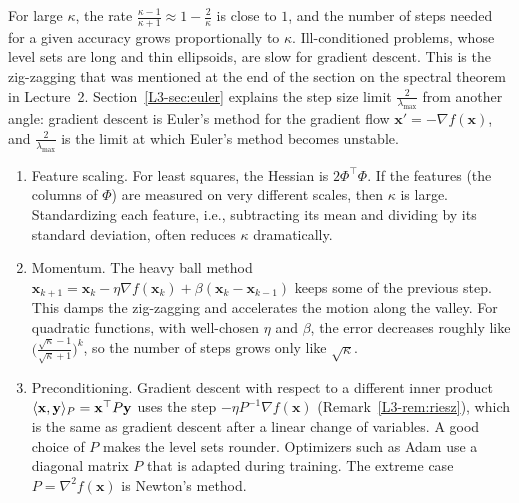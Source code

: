 For large $\kappa$, the rate $\frac{\kappa - 1}{\kappa + 1} \approx 1 - \frac{2}{\kappa}$ is close to $1$, and the number of steps needed for a given accuracy grows proportionally to $\kappa$. Ill-conditioned problems, whose level sets are long and thin ellipsoids, are slow for gradient descent. This is the zig-zagging that was mentioned at the end of the section on the spectral theorem in Lecture~2. Section~\ref{L3-sec:euler} explains the step size limit $\frac{2}{\lambda_{\max}}$ from another angle: gradient descent is Euler's method for the gradient flow $\mathbf{x}' = -\nabla f(\mathbf{x})$, and $\frac{2}{\lambda_{\max}}$ is the limit at which Euler's method becomes unstable.

\begin{remark}
    \begin{enumerate}
        \item Feature scaling. For least squares, the Hessian is $2\Phi^\top\Phi$. If the features (the columns of $\Phi$) are measured on very different scales, then $\kappa$ is large. Standardizing each feature, i.e., subtracting its mean and dividing by its standard deviation, often reduces $\kappa$ dramatically.
        \item Momentum. The heavy ball method $\mathbf{x}_{k+1} = \mathbf{x}_k - \eta\nabla f(\mathbf{x}_k) + \beta(\mathbf{x}_k - \mathbf{x}_{k-1})$ keeps some of the previous step. This damps the zig-zagging and accelerates the motion along the valley. For quadratic functions, with well-chosen $\eta$ and $\beta$, the error decreases roughly like $\big(\frac{\sqrt{\kappa} - 1}{\sqrt{\kappa} + 1}\big)^k$, so the number of steps grows only like $\sqrt{\kappa}$.
        \item Preconditioning. Gradient descent with respect to a different inner product $\langle \mathbf{x}, \mathbf{y} \rangle_P = \mathbf{x}^\top P\mathbf{y}$ uses the step $-\eta P^{-1}\nabla f(\mathbf{x})$ (Remark~\ref{L3-rem:riesz}), which is the same as gradient descent after a linear change of variables. A good choice of $P$ makes the level sets rounder. Optimizers such as Adam use a diagonal matrix $P$ that is adapted during training. The extreme case $P = \nabla^2 f(\mathbf{x})$ is Newton's method.
    \end{enumerate}
\end{remark}


